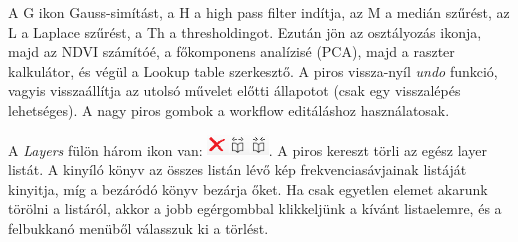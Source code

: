 \documentclass[a4paper,12pt]{article}
\begin{document}
A G ikon Gauss-simítást, a H a high pass filter indítja, az M a medián szűrést, az L a Laplace szűrést, a Th a thresholdingot. Ezután jön az osztályozás ikonja, majd az NDVI számítóé, a főkomponens analízisé (PCA), majd a raszter kalkulátor, és végül a Lookup table szerkesztő. A piros vissza-nyíl \textit{undo} funkció, vagyis visszaállítja az utolsó művelet előtti állapotot (csak egy visszalépés lehetséges). A nagy piros gombok a workflow editáláshoz használatosak.

A \textit{Layers} fülön három ikon van: \includegraphics[height=0.55cm]{layer_list_icons.png}. A piros kereszt törli az egész layer listát. A kinyíló könyv az összes listán lévő kép frekvenciasávjainak listáját kinyitja, míg a bezáródó könyv bezárja őket. Ha csak egyetlen elemet akarunk törölni a listáról, akkor a jobb egérgombbal klikkeljünk a kívánt listaelemre, és a felbukkanó menüből válasszuk ki a törlést.
\end{document}
